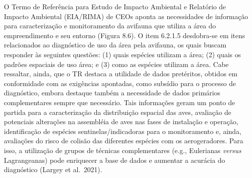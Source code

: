\documentclass[
  oneside]{scrbook}
\begin{document}
O Termo de Referência para Estudo de Impacto Ambiental e Relatório de Impacto Ambiental (EIA/RIMA) de CEOs aponta as necessidades de informação para caracterização e monitoramento da avifauna que utiliza a área do empreendimento e seu entorno (Figura 8.6). O item 6.2.1.5 desdobra-se em itens relacionados ao diagnóstico de uso da área pela avifauna, os quais buscam responder às seguintes questões: (1) quais espécies utilizam a área; (2) quais os padrões espaciais de uso área; e (3) como as espécies utilizam a área. Cabe ressaltar, ainda, que o TR destaca a utilidade de dados pretéritos, obtidos em conformidade com as exigências apontadas, como subsídio para o processo de diagnóstico, embora destaque também a necessidade de dados primários complementares sempre que necessário. Tais informações geram um ponto de partida para a caracterização da distribuição espacial das aves, avaliação de potenciais alterações na assembléia de aves nas fases de instalação e operação, identificação de espécies sentinelas/indicadoras para o monitoramento e, ainda, avaliações do risco de colisão das diferentes espécies com os aerogeradores. Para isso, a utilização de grupos de técnicas complementares (e.g., Eulerianas \emph{versus} Lagrangeanas) pode enriquecer a base de dados e aumentar a acurácia do diagnóstico (Largey et al.~2021).
\end{document}
